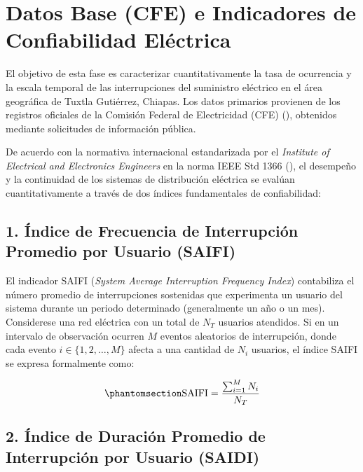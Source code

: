 \documentclass[
  spanish,
  letterpaper,
  DIV=11,
  numbers=noendperiod]{scrreprt}
\theoremstyle{plain}
\theoremstyle{definition}
\theoremstyle{remark}
\begin{document}
\section{Datos Base (CFE) e Indicadores de Confiabilidad
Eléctrica}\label{sec-datos-cfe}

El objetivo de esta fase es caracterizar cuantitativamente la tasa de
ocurrencia y la escala temporal de las interrupciones del suministro
eléctrico en el área geográfica de Tuxtla Gutiérrez, Chiapas. Los datos
primarios provienen de los registros oficiales de la Comisión Federal de
Electricidad (CFE) (), obtenidos mediante solicitudes de información
pública.

De acuerdo con la normativa internacional estandarizada por el
\emph{Institute of Electrical and Electronics Engineers} en la norma
IEEE Std 1366 (), el desempeño y la continuidad de los sistemas de distribución
eléctrica se evalúan cuantitativamente a través de dos índices
fundamentales de confiabilidad:

\subsection{1. Índice de Frecuencia de Interrupción Promedio por Usuario
(SAIFI)}\label{uxedndice-de-frecuencia-de-interrupciuxf3n-promedio-por-usuario-saifi}

El indicador SAIFI (\emph{System Average Interruption Frequency Index})
contabiliza el número promedio de interrupciones sostenidas que
experimenta un usuario del sistema durante un periodo determinado
(generalmente un año o un mes). Considerese una red eléctrica con un
total de \(N_T\) usuarios atendidos. Si en un intervalo de observación
ocurren \(M\) eventos aleatorios de interrupción, donde cada evento
\(i \in \{1, 2, \dots, M\}\) afecta a una cantidad de \(N_i\) usuarios,
el índice SAIFI se expresa formalmente como:

\begin{equation}\phantomsection\label{eq-saifi}{
\text{SAIFI} = \frac{\sum_{i=1}^{M} N_i}{N_T}
}\end{equation}

\subsection{2. Índice de Duración Promedio de Interrupción por Usuario
(SAIDI)}\label{uxedndice-de-duraciuxf3n-promedio-de-interrupciuxf3n-por-usuario-saidi}
\end{document}

